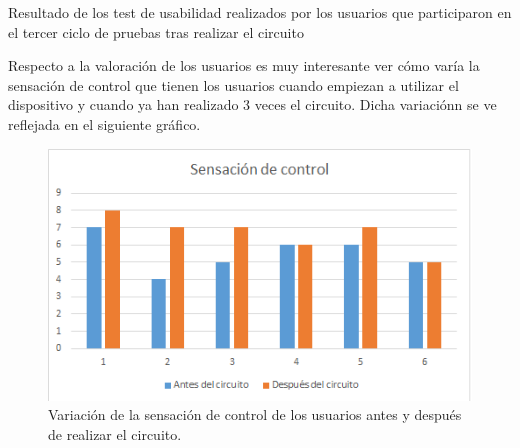 \documentclass[twoside, 11pt]{epstfg}
\begin{document}
\begin{itemize}
\begin{center}
\begin{table}[h!]
		\caption{Resultado de los test de usabilidad realizados por los usuarios que participaron en el tercer ciclo de pruebas tras realizar el circuito}
	\end{table}
\end{center}

\newpage
Respecto a la valoración de los usuarios es muy interesante ver cómo varía la sensación de control que tienen los usuarios cuando empiezan a utilizar el dispositivo y cuando ya han realizado 3 veces el circuito. Dicha variaciónn se ve reflejada en el siguiente gráfico.

\begin{figure}[H]
	\centerline{
		\mbox{\includegraphics[width=.85\textwidth]{images/SensacionControl.png}}
	}
	\caption{Variación de la sensación de control de los usuarios antes y después de realizar el circuito.}
	\label{SensacionControl}
\end{figure}



\end{itemize}
%
%
%
%
\end{document}
